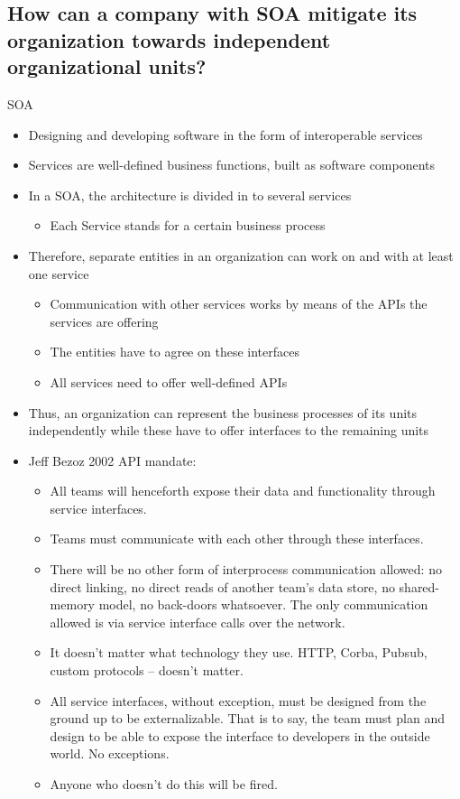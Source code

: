 \documentclass{article}
\begin{document}
\subsection{How can a company with SOA mitigate its organization towards independent organizational units?}
SOA
\begin{itemize}
    \item Designing and developing software in the form of interoperable services
    \item Services are well-defined business functions, built as software components
    \item In a SOA, the architecture is divided in to several services
          \begin{itemize}
              \item Each Service stands for a certain business process
          \end{itemize}
    \item Therefore, separate entities in an organization can work on and with at least one service
          \begin{itemize}
              \item Communication with other services works by means of the APIs the services are offering
              \item The entities have to agree on these interfaces
              \item All services need to offer well-defined APIs
          \end{itemize}
    \item Thus, an organization can represent the business processes of its units independently while these have to offer interfaces to the remaining units
    \item Jeff Bezoz 2002 API mandate:
          \begin{itemize}
              \item All teams will henceforth expose their data and functionality through service interfaces.
              \item Teams must communicate with each other through these interfaces.
              \item There will be no other form of interprocess communication allowed: no direct linking, no direct reads of another team's data store, no shared-memory model, no back-doors whatsoever. The only communication allowed is via service interface calls over the network.
              \item It doesn't matter what technology they use. HTTP, Corba, Pubsub, custom protocols -- doesn't matter.
              \item All service interfaces, without exception, must be designed from the ground up to be externalizable. That is to say, the team must plan and design to be able to expose the interface to developers in the outside world. No exceptions.
              \item Anyone who doesn't do this will be fired.
          \end{itemize}
\end{itemize}
\end{document}
